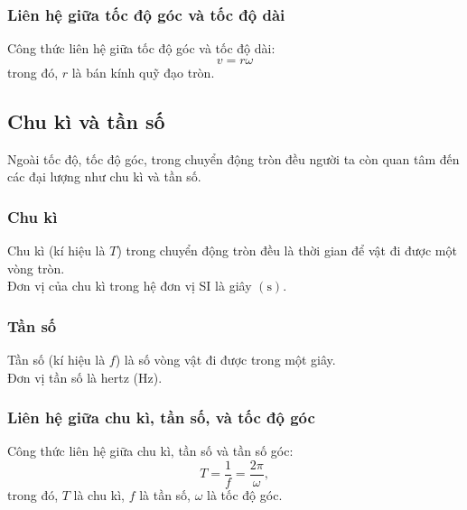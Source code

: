 \subsubsection{Liên hệ giữa tốc độ góc và tốc độ dài}
Công thức liên hệ giữa tốc độ góc và tốc độ dài:
$$v=r\omega$$ 
trong đó, $r$ là bán kính quỹ đạo tròn.		
\subsection{Chu kì và tần số}
Ngoài tốc độ, tốc độ góc, trong chuyển động tròn đều người ta còn quan tâm đến các đại lượng như chu kì và tần số.
\subsubsection{Chu kì}
Chu kì (kí hiệu là $T$) trong chuyển động tròn đều là thời gian để vật đi được một vòng tròn.\\
Đơn vị của chu kì trong hệ đơn vị SI là giây $\left(\si{\second}\right)$.
\subsubsection{Tần số}
Tần số (kí hiệu là $f$) là số vòng vật đi được trong một giây.\\
Đơn vị tần số là hertz (Hz).
\subsubsection{Liên hệ giữa chu kì, tần số, và tốc độ góc}
Công thức liên hệ giữa chu kì, tần số và tần số góc:
$$T=\dfrac{1}{f}=\dfrac{2\pi}{\omega},$$
trong đó, $T$ là chu kì, $f$ là tần số, $\omega$ là tốc độ góc. 				
